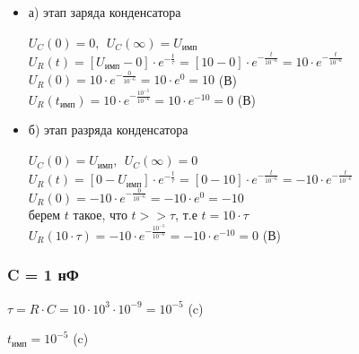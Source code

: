 \begin{itemize}
\item[] а) этап заряда конденсатора

		$U_C(0)	= 0,\ \ U_C(\infty) = U_\text{имп}$\\
		$U_R(t) = [U_\text{имп} - 0] \cdot e^{-\frac{t}{\tau}} = [10 - 0] \cdot e^{-\frac{t}{10^{-6}}} = 10 \cdot e^{-\frac{t}{10^{-6}}}$\\
		$U_R(0) = 10 \cdot e^{-\frac{0}{10^{-6}}} = 10 \cdot e^0 = 10$ (В)\\
		$U_R(t_\text{имп}) = 10 \cdot e^{-\frac{10^{-5}}{10^{-6}}} = 10 \cdot e^{-10} = 0$ (В)\\

\item[] б) этап разряда конденсатора
		
		$U_C(0)	= U_\text{имп},\ \ U_C(\infty) = 0$\\		
		$U_R(t) = [0 - U_\text{имп}] \cdot e^{-\frac{t}{\tau}} = [0 - 10] \cdot e^{-\frac{t}{10^{-6}}} = -10 \cdot e^{-\frac{t}{10^{-6}}}$\\
		$U_R(0) = -10 \cdot e^{-\frac{0}{10^{-6}}} = -10 \cdot e^0 = -10$\\
		берем $t$ такое, что $t >> \tau$, т.е $t = 10 \cdot \tau$ \\
		$U_R(10 \cdot \tau) = -10 \cdot e^{-\frac{10^{-5}}{10^{-6}}} = -10 \cdot e^{-10} = 0$ (В)\\
		
\end{itemize}

\subsubsection{C = 1 нФ}

		$\tau = R \cdot C = 10 \cdot 10^3 \cdot 10^{-9} = 10^{-5}$ (c)
		
		$t_\text{имп} = 10^{-5}$ (c)

